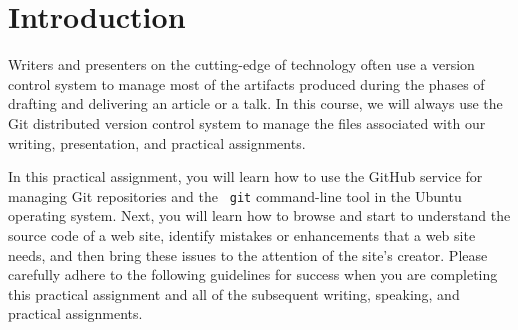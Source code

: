 

\usepackage[compact]{titlesec}



\vspace*{-.2in}
\section*{Introduction}

Writers and presenters on the cutting-edge of technology often use a version control system to manage most of the
artifacts produced during the phases of drafting and delivering an article or a talk. In this course, we will always use
the Git distributed version control system to manage the files associated with our writing, presentation, and practical
assignments.

In this practical assignment, you will learn how to use the GitHub service for managing Git repositories and the {\tt
git} command-line tool in the Ubuntu operating system. Next, you will learn how to browse and start to understand the
source code of a web site, identify mistakes or enhancements that a web site needs, and then bring these issues to the
attention of the site's creator. Please carefully adhere to the following guidelines for success when you are completing
this practical assignment and all of the subsequent writing, speaking, and practical assignments.

